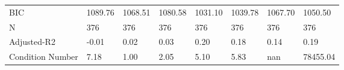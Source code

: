 \begin{table}
\begin{center}
\begin{tabular}{llllllll}
BIC                                                       & 1089.76  & 1068.51 & 1080.58 & 1031.10 & 1039.78  & 1067.70            & 1050.50    \\
N                                                         & 376      & 376     & 376     & 376     & 376      & 376                & 376        \\
Adjusted-R2                                               & -0.01    & 0.02    & 0.03    & 0.20    & 0.18     & 0.14               & 0.19       \\
Condition Number                                          & 7.18     & 1.00    & 2.05    & 5.10    & 5.83     & nan                & 78455.04   \\
\hline
\end{tabular}
\end{center}
\end{table}
